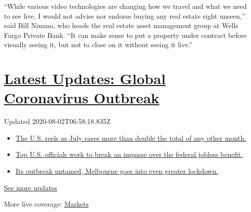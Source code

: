 ``While various video technologies are changing how we travel and what
we need to see live, I would not advise nor endorse buying any real
estate sight unseen,'' said Bill Nimmo, who heads the real estate asset
management group at Wells Fargo Private Bank. ``It can make sense to put
a property under contract before visually seeing it, but not to close on
it without seeing it live.''

\hypertarget{latest-updates-global-coronavirus-outbreak}{%
\section{\texorpdfstring{\href{https://www.nytimes3xbfgragh.onion/2020/08/01/world/coronavirus-covid-19.html?action=click\&pgtype=Article\&state=default\&region=MAIN_CONTENT_1\&context=storylines_live_updates}{Latest
Updates: Global Coronavirus
Outbreak}}{Latest Updates: Global Coronavirus Outbreak}}\label{latest-updates-global-coronavirus-outbreak}}

Updated 2020-08-02T06:58:18.835Z

\begin{itemize}
\tightlist
\item
  \href{https://www.nytimes3xbfgragh.onion/2020/08/01/world/coronavirus-covid-19.html?action=click\&pgtype=Article\&state=default\&region=MAIN_CONTENT_1\&context=storylines_live_updates\#link-34047410}{The
  U.S. reels as July cases more than double the total of any other
  month.}
\item
  \href{https://www.nytimes3xbfgragh.onion/2020/08/01/world/coronavirus-covid-19.html?action=click\&pgtype=Article\&state=default\&region=MAIN_CONTENT_1\&context=storylines_live_updates\#link-780ec966}{Top
  U.S. officials work to break an impasse over the federal jobless
  benefit.}
\item
  \href{https://www.nytimes3xbfgragh.onion/2020/08/01/world/coronavirus-covid-19.html?action=click\&pgtype=Article\&state=default\&region=MAIN_CONTENT_1\&context=storylines_live_updates\#link-2bc8948}{Its
  outbreak untamed, Melbourne goes into even greater lockdown.}
\end{itemize}

\href{https://www.nytimes3xbfgragh.onion/2020/08/01/world/coronavirus-covid-19.html?action=click\&pgtype=Article\&state=default\&region=MAIN_CONTENT_1\&context=storylines_live_updates}{See
more updates}

More live coverage:
\href{https://www.nytimes3xbfgragh.onion/live/2020/07/31/business/stock-market-today-coronavirus?action=click\&pgtype=Article\&state=default\&region=MAIN_CONTENT_1\&context=storylines_live_updates}{Markets}

